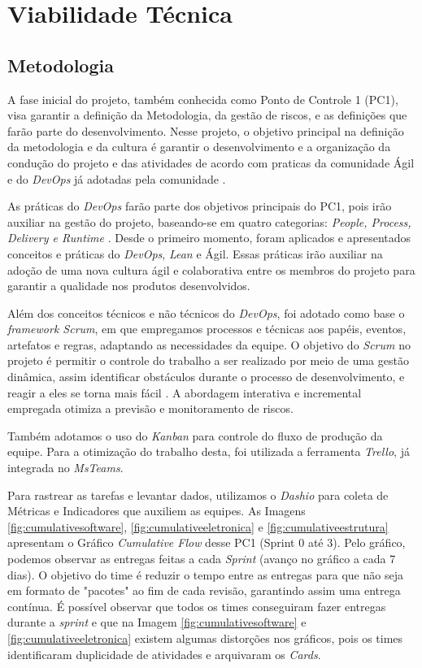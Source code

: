 \section{Viabilidade Técnica}
\label{recursosHumanos}
\subsection{Metodologia}

A fase inicial do projeto, também conhecida como Ponto de Controle 1 (PC1), visa garantir a definição da Metodologia, da gestão de riscos, e as definições que farão parte do desenvolvimento. Nesse projeto, 
o objetivo principal na definição da metodologia e da cultura é garantir o desenvolvimento e a organização da condução do projeto e das atividades de acordo com praticas da comunidade Ágil e do  \textit{DevOps} já adotadas pela comunidade \cite{licorish2016adoption}. 

As práticas do  \textit{DevOps} farão parte dos objetivos principais do PC1, pois irão auxiliar na gestão do projeto, baseando-se em quatro categorias: \textit{People, Process, Delivery e Runtime} \cite{leite2019survey}. Desde o primeiro momento, foram aplicados e apresentados conceitos e práticas do  \textit{DevOps},  \textit{Lean} e Ágil. Essas práticas irão auxiliar na adoção de uma nova cultura ágil e colaborativa entre os membros do projeto para garantir a qualidade nos produtos desenvolvidos. 

Além dos conceitos técnicos e não técnicos do  \textit{DevOps}, foi adotado como base o \textit{framework Scrum}, em que empregamos processos e técnicas aos papéis, eventos, artefatos e regras, adaptando as necessidades da equipe. O objetivo do \textit{Scrum} no projeto é permitir o controle do trabalho a ser realizado por meio de uma gestão dinâmica, assim identificar obstáculos durante o processo de desenvolvimento, e reagir a eles se torna mais fácil \cite{gren2015prospects} \cite{gren2020agile} \cite{licorish2016adoption}. A abordagem interativa e incremental empregada otimiza a previsão e monitoramento de riscos.

Também adotamos o uso do  \textit{Kanban} para controle do fluxo de produção da equipe. Para a otimização do trabalho desta, foi utilizada a ferramenta  \textit{Trello}, já integrada no  \textit{MsTeams}. 

Para rastrear as tarefas e levantar dados, utilizamos o  \textit{Dashio} para coleta de Métricas e Indicadores que auxiliem as equipes. As Imagens \ref{fig:cumulativesoftware}, \ref{fig:cumulativeeletronica} e \ref{fig:cumulativeestrutura} apresentam o Gráfico \textit{Cumulative Flow} desse PC1 (Sprint 0 até 3). Pelo gráfico, podemos observar as entregas feitas a cada \textit{Sprint} (avanço no gráfico a cada 7 dias). O objetivo do time é reduzir o tempo entre as entregas para que não seja em formato de "pacotes" ao fim de cada revisão, garantindo assim uma entrega contínua. É possível observar que todos os times conseguiram fazer entregas durante a  \textit{sprint} e que na Imagem \ref{fig:cumulativesoftware} e \ref{fig:cumulativeeletronica} existem algumas distorções nos gráficos, pois os times identificaram duplicidade de atividades e arquivaram os \textit{Cards}.


